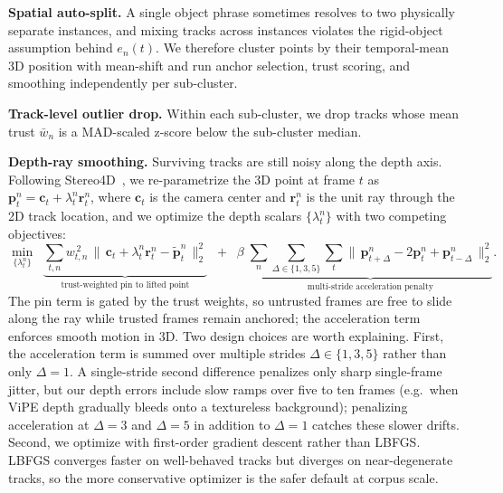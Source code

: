 \noindent\textbf{Spatial auto-split.}
A single object phrase sometimes resolves to two physically separate instances, and mixing tracks across instances violates the rigid-object assumption behind $e_n(t)$. We therefore cluster points by their temporal-mean 3D position with mean-shift and run anchor selection, trust scoring, and smoothing independently per sub-cluster.

\noindent\textbf{Track-level outlier drop.}
Within each sub-cluster, we drop tracks whose mean trust $\bar w_n$ is a MAD-scaled z-score below the sub-cluster median.

\noindent\textbf{Depth-ray smoothing.}
Surviving tracks are still noisy along the depth axis. Following Stereo4D~\cite{stereo4d}, we re-parametrize the 3D point at frame $t$ as $\mathbf{p}_t^{n} = \mathbf{c}_t + \lambda_t^{n}\mathbf{r}_t^{n}$, where $\mathbf{c}_t$ is the camera center and $\mathbf{r}_t^{n}$ is the unit ray through the 2D track location, and we optimize the depth scalars $\{\lambda_t^{n}\}$ with two competing objectives:
\begin{equation}
\min_{\{\lambda_t^{n}\}}\;\;
\underbrace{\sum_{t,n} w_{t,n}^{\,2}\,\bigl\|\,\mathbf{c}_t + \lambda_t^{n}\mathbf{r}_t^{n} - \tilde{\mathbf{p}}_t^{n}\,\bigr\|_2^{2}}_{\text{trust-weighted pin to lifted point}}
\;\;+\;\;
\beta\;\underbrace{\sum_{n}\sum_{\Delta\in\{1,3,5\}}\sum_t \bigl\|\,\mathbf{p}_{t+\Delta}^{n} - 2\mathbf{p}_t^{n} + \mathbf{p}_{t-\Delta}^{n}\,\bigr\|_2^{2}}_{\text{multi-stride acceleration penalty}} .
\end{equation}
The pin term is gated by the trust weights, so untrusted frames are free to slide along the ray while trusted frames remain anchored; the acceleration term enforces smooth motion in 3D. Two design choices are worth explaining. First, the acceleration term is summed over multiple strides $\Delta\in\{1,3,5\}$ rather than only $\Delta=1$. A single-stride second difference penalizes only sharp single-frame jitter, but our depth errors include slow ramps over five to ten frames (e.g.\ when ViPE depth gradually bleeds onto a textureless background); penalizing acceleration at $\Delta=3$ and $\Delta=5$ in addition to $\Delta=1$ catches these slower drifts. Second, we optimize with first-order gradient descent rather than LBFGS. LBFGS converges faster on well-behaved tracks but diverges on near-degenerate tracks, so the more conservative optimizer is the safer default at corpus scale.

\section{\benchmarkname{}}
\label{subsec:appendix_3dworldbench}

